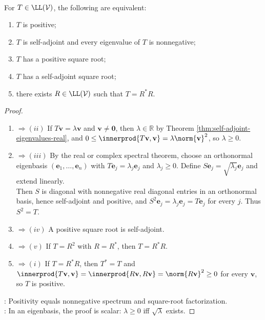 \begin{theorem} \label{thm:positive-operator-characterization} \\
For $T\in\LL(\mathcal{V})$, the following are equivalent:
\begin{enumerate}[label=\roman*.]
\setlength{\itemsep}{0pt}
\item $T$ is positive;
\item $T$ is self-adjoint and every eigenvalue of $T$ is nonnegative;
\item $T$ has a positive square root;
\item $T$ has a self-adjoint square root;
\item there exists $R\in\LL(\mathcal{V})$ such that $T=R^*R$.
\end{enumerate}
\begin{proof}
\begin{enumerate}[label=(\roman*).]
\setlength{\itemsep}{0pt}
\item[$(i)$]$\Rightarrow (ii)$ If $T\mathbf{v}=\lambda\mathbf{v}$ and $\mathbf{v}\neq\mathbf{0}$, then $\lambda\in\mathbb{R}$ by Theorem \ref{thm:self-adjoint-eigenvalues-real}, and $0\leq\innerprod{T\mathbf{v},\mathbf{v}}=\lambda\norm{\mathbf{v}}^2$, so $\lambda\geq0$.
\item[$(ii)$]$\Rightarrow (iii)$ By the real or complex spectral theorem, choose an orthonormal eigenbasis $(\mathbf{e}_1,\ldots,\mathbf{e}_n)$ with $T\mathbf{e}_j=\lambda_j\mathbf{e}_j$ and $\lambda_j\geq0$. Define $S\mathbf{e}_j=\sqrt{\lambda_j}\mathbf{e}_j$ and extend linearly.\\
Then $S$ is diagonal with nonnegative real diagonal entries in an orthonormal basis, hence self-adjoint and positive, and $S^2\mathbf{e}_j=\lambda_j\mathbf{e}_j=T\mathbf{e}_j$ for every $j$. Thus $S^2=T$.
\item[$(iii)$]$\Rightarrow (iv)$ A positive square root is self-adjoint.
\item[$(iv)$]$\Rightarrow (v)$ If $T=R^2$ with $R=R^*$, then $T=R^*R$.
\item[$(v)$]$\Rightarrow (i)$ If $T=R^*R$, then $T^*=T$ and $\innerprod{T\mathbf{v},\mathbf{v}}=\innerprod{R\mathbf{v},R\mathbf{v}}=\norm{R\mathbf{v}}^2\geq0$ for every $\mathbf{v}$, so $T$ is positive.
\end{enumerate}
: Positivity equals nonnegative spectrum and square-root factorization.\\
: In an eigenbasis, the proof is scalar: $\lambda\geq0$ iff $\sqrt{\lambda}$ exists.
\end{proof}
\end{theorem}

